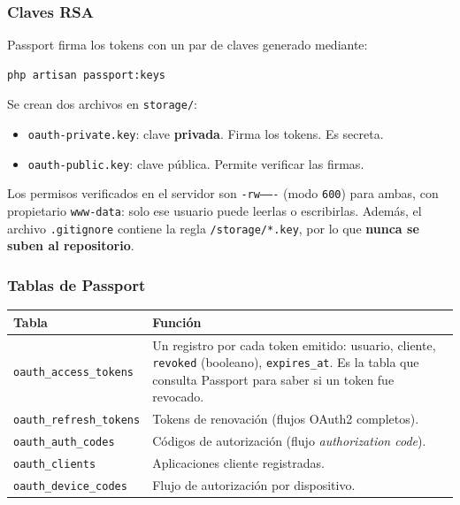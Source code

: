 \subsubsection{Claves RSA}
Passport firma los tokens con un par de claves generado mediante:
\begin{lstlisting}[language=bash, caption={Generación de claves y cliente de Passport}]
php artisan passport:keys
\end{lstlisting}
Se crean dos archivos en \texttt{storage/}:
\begin{itemize}
    \item \texttt{oauth-private.key}: clave \textbf{privada}. Firma los tokens. Es secreta.
    \item \texttt{oauth-public.key}: clave pública. Permite verificar las firmas.
\end{itemize}
Los permisos verificados en el servidor son \texttt{-rw-------} (modo \texttt{600}) para ambas, con propietario \texttt{www-data}: solo ese usuario puede leerlas o escribirlas. Además, el archivo \texttt{.gitignore} contiene la regla \texttt{/storage/*.key}, por lo que \textbf{nunca se suben al repositorio}.

\subsubsection{Tablas de Passport}
\begin{longtable}{p{5.2cm}p{9.8cm}}
\toprule
\textbf{Tabla} & \textbf{Función} \\
\midrule
\endhead
\texttt{oauth\_access\_tokens} & Un registro por cada token emitido: usuario, cliente, \texttt{revoked} (booleano), \texttt{expires\_at}. Es la tabla que consulta Passport para saber si un token fue revocado. \\
\texttt{oauth\_refresh\_tokens} & Tokens de renovación (flujos OAuth2 completos). \\
\texttt{oauth\_auth\_codes} & Códigos de autorización (flujo \emph{authorization code}). \\
\texttt{oauth\_clients} & Aplicaciones cliente registradas. \\
\texttt{oauth\_device\_codes} & Flujo de autorización por dispositivo. \\
\bottomrule
\end{longtable}


